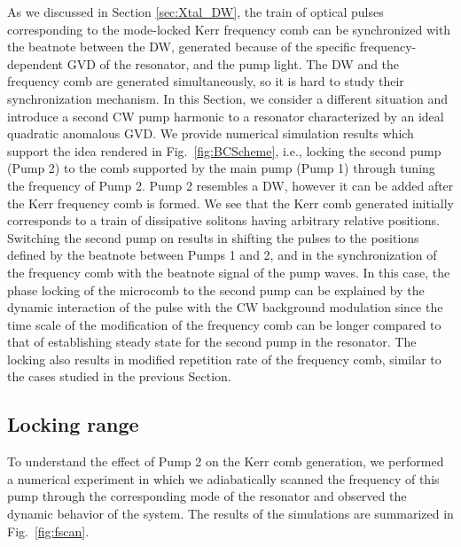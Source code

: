 As we discussed in Section \ref{sec:Xtal_DW}, the train of optical pulses corresponding to the mode-locked Kerr frequency comb can be synchronized with the beatnote between the DW, generated because of the specific frequency-dependent GVD of the resonator, and the pump light. The DW and the frequency comb are generated simultaneously, so it is hard to study their synchronization mechanism. In this Section, we consider a different situation and introduce a second CW pump harmonic to a resonator characterized by an ideal quadratic anomalous GVD. We provide numerical simulation results which support the idea rendered in Fig.~\ref{fig:BCScheme}, i.e., locking the second pump (Pump 2) to the comb supported by the main pump (Pump 1) through tuning the frequency of Pump 2. Pump 2 resembles a DW, however it can be added after the Kerr frequency comb is formed. We see that the Kerr comb generated initially corresponds to a train of dissipative solitons having arbitrary relative positions. Switching the second pump on results in shifting the pulses to the positions defined by the beatnote between Pumps 1 and 2, and in the synchronization of the frequency comb with the beatnote signal of the pump waves. In this case, the phase locking of the microcomb to the second pump can be explained by the dynamic interaction of the pulse with the CW background modulation since the time scale of the modification of the frequency comb can be longer compared to that of establishing steady state for the second pump in the resonator. The locking also results in modified repetition rate of the frequency comb, similar to the cases studied in the previous Section.

\subsection{Locking range}

To understand the effect of Pump 2 on the Kerr comb generation, we performed a numerical experiment in which we adiabatically scanned the frequency of this pump through the corresponding mode of the resonator and observed the dynamic behavior of the system. The results of the simulations are summarized in Fig.~\ref{fig:fscan}.

